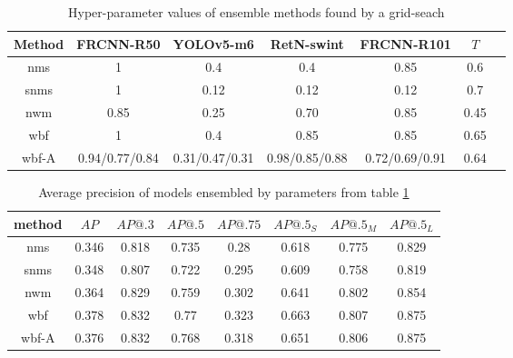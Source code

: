 \begin{table}[H]
    \begin{tabular}{|c|c|c|c|c|c|c|}
        \hline
        Method & FRCNN-R50      & YOLOv5-m6      & RetN-swint     & FRCNN-R101     & $T$  \\ \hline
        nms    & 1              & 0.4            & 0.4            & 0.85           & 0.6  \\ \hline
        snms   & 1              & 0.12           & 0.12           & 0.12           & 0.7  \\ \hline
        nwm    & 0.85           & 0.25           & 0.70           & 0.85           & 0.45 \\ \hline
        wbf    & 1              & 0.4            & 0.85           & 0.85           & 0.65 \\ \hline
        wbf-A  & 0.94/0.77/0.84 & 0.31/0.47/0.31 & 0.98/0.85/0.88 & 0.72/0.69/0.91 & 0.64 \\ \hline
    \end{tabular}
    \caption{Hyper-parameter values of ensemble methods found by a grid-seach}
    \label{tab:ensemble_params:grid_search}
\end{table}


\begin{table}[H]
    \centering
    \begin{tabular}{|c|c|c|c|c|c|c|c|}
        \hline
        method & $AP$  & $AP@.3$ & $AP@.5$ & $AP@.75$ & $AP@.5_S$ & $AP@.5_M$ & $AP@.5_L$ \\ \hline
        nms    & 0.346 & 0.818   & 0.735   & 0.28     & 0.618     & 0.775     & 0.829     \\ \hline
        snms   & 0.348 & 0.807   & 0.722   & 0.295    & 0.609     & 0.758     & 0.819     \\ \hline
        nwm    & 0.364 & 0.829   & 0.759   & 0.302    & 0.641     & 0.802     & 0.854     \\ \hline
        wbf    & 0.378 & 0.832   & 0.77    & 0.323    & 0.663     & 0.807     & 0.875     \\ \hline
        wbf-A  & 0.376 & 0.832   & 0.768   & 0.318    & 0.651     & 0.806     & 0.875     \\ \hline
    \end{tabular}
    \caption{Average precision of models ensembled by parameters from table \ref{tab:ensemble_params:grid_search}}
    \label{tab:precision:grid_search}
\end{table}



